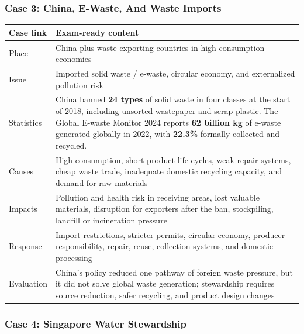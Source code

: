 \documentclass[11pt,a4paper]{article}
\newcommand{\term}[1]{\textcolor{HeadingBlue}{\textbf{#1}}}
\begin{document}
\subsubsection{Case 3: China, E-Waste, And Waste Imports}

\begin{tabularx}{\textwidth}{L{0.18\textwidth}Y}
\toprule
\textbf{Case link} & \textbf{Exam-ready content} \\
\midrule
Place & China plus waste-exporting countries in high-consumption economies \\
Issue & Imported solid waste / e-waste, circular economy, and externalized
pollution risk \\
Statistics & China banned \term{24 types} of solid waste in four classes at
the start of 2018, including unsorted wastepaper and scrap plastic. The Global
E-waste Monitor 2024 reports \term{62 billion kg} of e-waste generated
globally in 2022, with \term{22.3\%} formally collected and recycled. \\
Causes & High consumption, short product life cycles, weak repair systems,
cheap waste trade, inadequate domestic recycling capacity, and demand for raw
materials \\
Impacts & Pollution and health risk in receiving areas, lost valuable
materials, disruption for exporters after the ban, stockpiling, landfill or
incineration pressure \\
Response & Import restrictions, stricter permits, circular economy, producer
responsibility, repair, reuse, collection systems, and domestic processing \\
Evaluation & China's policy reduced one pathway of foreign waste pressure, but
it did not solve global waste generation; stewardship requires source
reduction, safer recycling, and product design changes \\
\bottomrule
\end{tabularx}

\subsubsection{Case 4: Singapore Water Stewardship}
\end{document}
